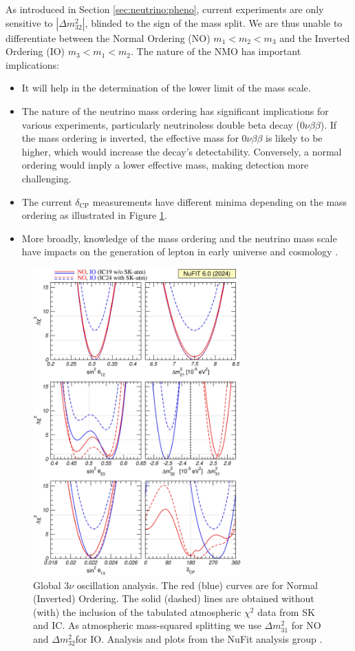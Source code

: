 As introduced in Section \ref{sec:neutrino:pheno}, current experiments are only sensitive to $|\Delta m^2_{32}|$, blinded to the sign of the mass split. We are thus unable to differentiate between the Normal Ordering (NO) $m_1 < m_2 < m_3$ and the Inverted Ordering (IO) $m_3 < m_1 < m_2$. The nature of the NMO has important implications:
\begin{itemize}
  \item It will help in the determination of the lower limit of the mass scale.
  \item The nature of the neutrino mass ordering has significant implications for various experiments, particularly neutrinoless double beta decay ($0\nu\beta\beta$). If the mass ordering is inverted, the effective mass for $0\nu\beta\beta$ is likely to be higher, which would increase the decay's detectability. Conversely, a normal ordering would imply a lower effective mass, making detection more challenging.
  \item The current $\delta_{\text{CP}}$ measurements have different minima depending on the mass ordering as illustrated in Figure \ref{fig:neutrino:chi2_proj}.
  \item More broadly, knowledge of the mass ordering and the neutrino mass scale have impacts on the generation of lepton in early universe and cosmology \cite{hannestad_cosmology_2016}.
\end{itemize}

\begin{figure}[ht]
  \centering
  \includegraphics[width=8cm]{images/neutrinos/chi2_proj.jpg}
  \caption{Global 3$\nu$ oscillation analysis. The red (blue) curves are for Normal (Inverted) Ordering. The solid (dashed) lines are obtained without (with) the inclusion of the tabulated atmospheric $\chi^2$ data from SK and IC. As atmospheric mass-squared splitting we use $\Delta m^2_{31}$ for NO and $\Delta m^2_{32}$for IO. Analysis and plots from the NuFit analysis group \cite{esteban_nufit-60_2024, noauthor_nufit_nodate}.}
  \label{fig:neutrino:chi2_proj}
\end{figure}

